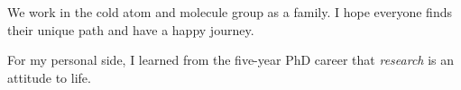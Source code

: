 We work in the cold atom and molecule group as a family. I hope everyone finds their unique path and have a happy journey.



For my personal side, I learned from the five-year PhD career that \textit{research} is an attitude to life. 
